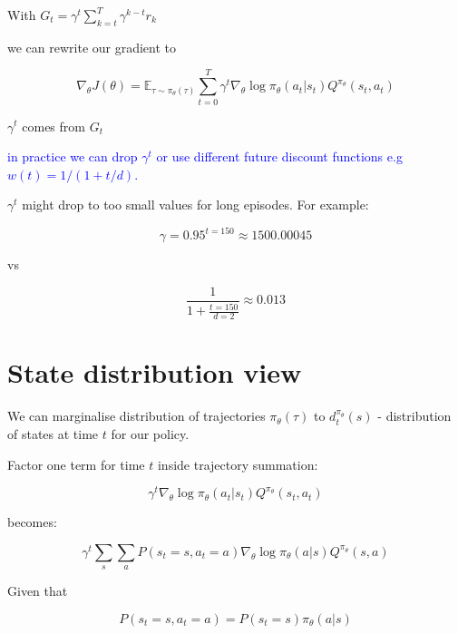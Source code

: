 \documentclass[preprint,12pt]{elsarticle}
\begin{document}
With $G_t = \gamma^t \sum_{k=t}^T \gamma^{k-t} r_k$

we can rewrite our gradient to 


\begin{equation}
\label{eq:policy-gradient-q-form}
\nabla_\theta J(\theta) = \mathbb{E}_{\tau \sim \pi_\theta(\tau)}  \sum_{t=0}^T \gamma^t \nabla_\theta \log \pi_\theta(a_t | s_t) Q^{\pi_\theta}(s_t, a_t)
\end{equation}


$\gamma^t$ comes from $G_t$

\textcolor{blue}{
in practice we can drop $\gamma^t$ or use different future discount functions e.g $w(t) = 1/(1 + t/d)$.}


$\gamma^t$ might drop to too small values for long episodes. For example:


\begin{equation}
\label{eq:exponential-discount-example}
\gamma=0.95^{t=150} \approx 1500.00045
\end{equation}

vs

\begin{equation}
\label{eq:hyperbolic-discount-example}
\frac{1} {1+ \frac{t=150}{d=2}} \approx  0.013
\end{equation}


\section*{State distribution view}
We can marginalise distribution of trajectories $\pi_\theta(\tau)$ to $d^{\pi_\theta}_t(s)$ - distribution of states at time $t$ for our policy.

Factor one term for time $t$ inside trajectory summation:

\begin{equation}
\label{eq:state-distribution-term}
\gamma^t \nabla_\theta \log \pi_\theta(a_t|s_t) Q^{\pi_\theta}(s_t,a_t)
\end{equation}

becomes:

\begin{equation}
\gamma^t \label{eq:state-action-marginal}
\sum_s \sum_a P(s_t=s, a_t=a) \nabla_\theta \log \pi_\theta(a|s) Q^{\pi_\theta}(s,a)
\end{equation}

Given that

\begin{equation}
\label{eq:state-action-factorization}
P(s_t=s, a_t=a) = P(s_t=s)\pi_\theta(a|s)
\end{equation}
\end{document}
